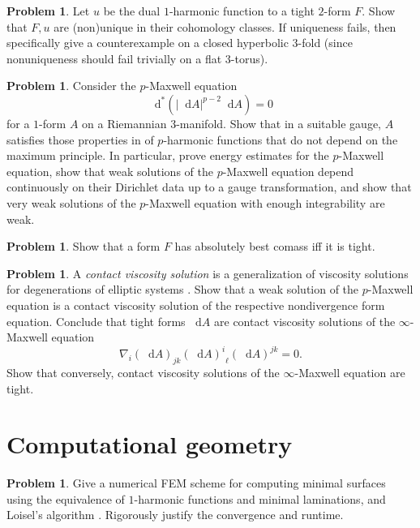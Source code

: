 \documentclass[reqno,11pt]{amsart}
\newcommand*\dif{\mathop{}\!\mathrm{d}}
\newcommand{\dfn}[1]{\emph{#1}\index{#1}}
\theoremstyle{definition}
\newtheorem{problem}[theorem]{Problem}
\numberwithin{equation}{section}
\begin{document}
\begin{problem}
Let $u$ be the dual $1$-harmonic function to a tight $2$-form $F$.
Show that $F, u$ are (non)unique in their cohomology classes.
If uniqueness fails, then specifically give a counterexample on a closed hyperbolic $3$-fold (since nonuniqueness should fail trivially on a flat $3$-torus).
\end{problem}

\begin{problem}
Consider the $p$-Maxwell equation 
$$\dif^*(|\dif A|^{p - 2} \dif A) = 0$$
for a $1$-form $A$ on a Riemannian $3$-manifold.
Show that in a suitable gauge, $A$ satisfies those properties in \cite[Chapters 10 and 11]{kinnunen2021maximal} of $p$-harmonic functions that do not depend on the maximum principle.
In particular, prove energy estimates for the $p$-Maxwell equation, show that weak solutions of the $p$-Maxwell equation depend continuously on their Dirichlet data up to a gauge transformation, and show that very weak solutions of the $p$-Maxwell equation with enough integrability are weak.
\end{problem}

\begin{problem}
Show that a form $F$ has absolutely best comass iff it is tight.
\end{problem}

\begin{problem}
A \dfn{contact viscosity solution} is a generalization of viscosity solutions for degenerations of elliptic systems \cite{katzourakis2022vectorvalued}.
Show that a weak solution of the $p$-Maxwell equation is a contact viscosity solution of the respective nondivergence form equation.
Conclude that tight forms $\dif A$ are contact viscosity solutions of the $\infty$-Maxwell equation 
$$\nabla_i (\dif A)_{jk} {(\dif A)^i}_\ell (\dif A)^{jk} = 0.$$
Show that conversely, contact viscosity solutions of the $\infty$-Maxwell equation are tight.
\end{problem}

\section{Computational geometry}
\begin{problem}
Give a numerical FEM scheme for computing minimal surfaces using the equivalence of $1$-harmonic functions and minimal laminations, and Loisel's algorithm \cite{Loisel20}.
Rigorously justify the convergence and runtime.
\end{problem}


\printbibliography
\end{document}
